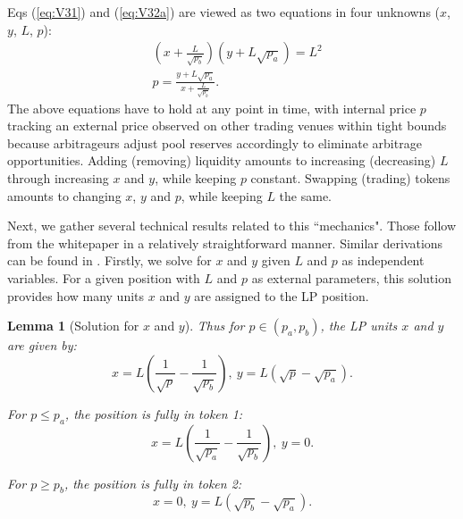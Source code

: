 \documentclass[pdftex,11pt,a4paper] {article}
\newtheorem{lemma}{Lemma}[section]
\begin{document}
Eqs (\ref{eq:V31}) and (\ref{eq:V32a}) are viewed as two equations in four
unknowns ($x$, $y$, $L$, $p$):
\begin{equation}  \label{eq:V33}
\begin{split}
& \left( x + \frac{L}{\sqrt{p_{b}}}\right)\left( y + L\sqrt{p_{a}} \right) =
L^{2} \\
& p = \frac{y + L\sqrt{p_{a}}}{x+\frac{L}{\sqrt{p_{b}}}}.
\end{split}%
\end{equation}
The above equations have to hold at any point in time, with internal price $%
p $ tracking an external price observed on other trading venues within tight
bounds because arbitrageurs adjust pool reserves accordingly to eliminate
arbitrage opportunities. Adding (removing) liquidity amounts to increasing
(decreasing) $L$ through increasing $x$ and $y$, while keeping $p$ constant.
Swapping (trading) tokens amounts to changing $x$, $y$ and $p$,
while keeping $L$ the same.

Next,  we gather several technical results related to this ``mechanics".
Those follow from the whitepaper \cite{V3} in a relatively straightforward manner. Similar derivations can be found in \cite{Elsts2021}.
Firstly, we solve for $x$ and $y$ given $L$ and $p$ as independent
variables. For a given position with $L$ and $p$ as external parameters,
this solution provides how many units $x$ and $y$ are assigned to the LP
position.


\begin{lemma}[Solution for $x$ and $y$]
Thus for $p \in (p_{a}, p_{b})$, the LP units $x$ and $y$ are given by:
\begin{equation}  \label{eq:V34}
x = L\left(\frac{1}{\sqrt{p}} - \frac{1}{\sqrt{p_{b}}}\right), \ y = L \left(%
\sqrt{p} - \sqrt{p_{a}}\right).
\end{equation}

For $p \leq p_{a}$, the position is fully in token 1:
\begin{equation}  \label{eq:V34a}
x = L\left(\frac{1}{\sqrt{p_{a}}} - \frac{1}{\sqrt{p_{b}}}\right), \ y = 0.
\end{equation}

For $p \geq p_{b}$, the position is fully in token 2:
\begin{equation}  \label{eq:V34b}
x = 0, \ y = L \left(\sqrt{p_{b}} - \sqrt{p_{a}}\right).
\end{equation}
\end{lemma}
\end{document}
